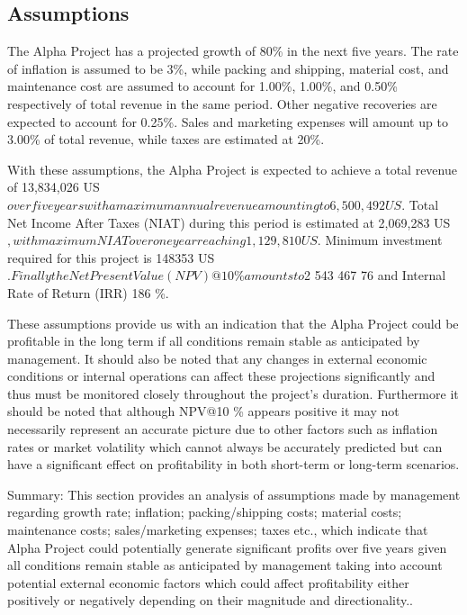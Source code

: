 

\subsection{Assumptions}\label{sec:assumptions}
The Alpha Project has a projected growth of 80\% in the next five years. The rate of inflation is assumed to be 3\%, while packing and shipping, material cost, and maintenance cost are assumed to account for 1.00\%, 1.00\%, and 0.50\% respectively of total revenue in the same period. Other negative recoveries are expected to account for 0.25\%. Sales and marketing expenses will amount up to 3.00\% of total revenue, while taxes are estimated at 20\%. 

With these assumptions, the Alpha Project is expected to achieve a total revenue of 13,834,026 US$ over five years with a maximum annual revenue amounting to 6,500,492 US$. Total Net Income After Taxes (NIAT) during this period is estimated at 2,069,283 US$, with maximum NIAT over one year reaching 1,129,810 US$. Minimum investment required for this project is 148353 US$. Finally the Net Present Value (NPV)@10\% amounts to $2 543 467 76 and Internal Rate of Return (IRR) 186 \%. 

These assumptions provide us with an indication that the Alpha Project could be profitable in the long term if all conditions remain stable as anticipated by management. It should also be noted that any changes in external economic conditions or internal operations can affect these projections significantly and thus must be monitored closely throughout the project's duration. Furthermore it should be noted that although NPV@10 \% appears positive it may not necessarily represent an accurate picture due to other factors such as inflation rates or market volatility which cannot always be accurately predicted but can have a significant effect on profitability in both short-term or long-term scenarios. 

Summary: This section provides an analysis of assumptions made by management regarding growth rate; inflation; packing/shipping costs; material costs; maintenance costs; sales/marketing expenses; taxes etc., which indicate that Alpha Project could potentially generate significant profits over five years given all conditions remain stable as anticipated by management taking into account potential external economic factors which could affect profitability either positively or negatively depending on their magnitude and directionality..